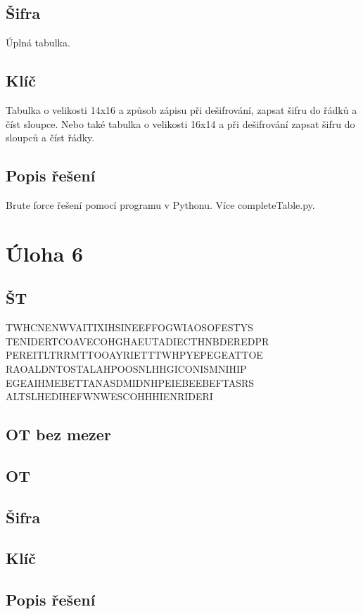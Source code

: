 \documentclass[12pt]{article} %
\begin{document}
\subsection{Šifra}
Úplná tabulka.
\subsection{Klíč}
Tabulka o velikosti 14x16 a způsob zápisu při dešifrování, zapsat šifru do řádků a číst sloupce. 
Nebo také tabulka o velikosti 16x14 a při dešifrování zapsat šifru do sloupců a číst řádky.
\subsection{Popis řešení}
Brute force řešení pomocí programu v Pythonu. Více completeTable.py. 



\section{Úloha 6}
\subsection{ŠT}
TWHCNENWVAITIXIHSINEEFFOGWIAOSOFESTYS
TENIDERTCOAVECOHGHAEUTADIECTHNBDEREDPR
PEREITLTRRMTTOOAYRIETTTWHPYEPEGEATTOE
RAOALDNTOSTALAHPOOSNLHHGICONISMNIHIP
EGEAIHMEBETTANASDMIDNHPEIEBEEBEFTASRS
ALTSLHEDIHEFWNWESCOHHHIENRIDERI

\subsection{OT bez mezer}

\subsection{OT}

\subsection{Šifra}

\subsection{Klíč}

\subsection{Popis řešení}
\end{document}
